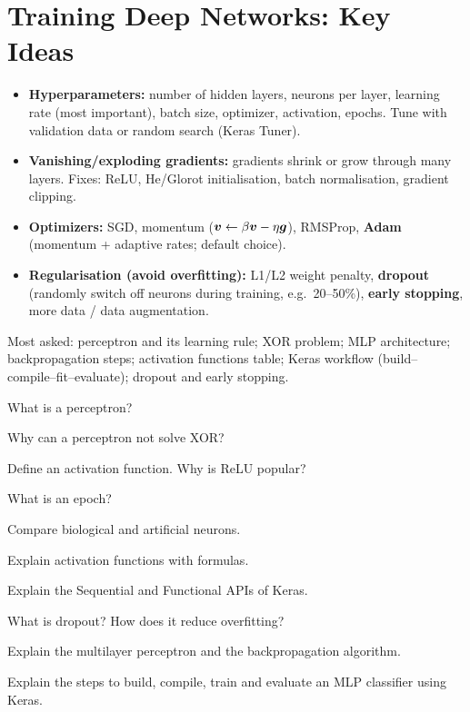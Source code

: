 \section{Training Deep Networks: Key Ideas}
\begin{itemize}
  \item \textbf{Hyperparameters:} number of hidden layers, neurons per layer, learning rate (most important), batch size, optimizer, activation, epochs. Tune with validation data or random search (Keras Tuner).
  \item \textbf{Vanishing/exploding gradients:} gradients shrink or grow through many layers. Fixes: ReLU, He/Glorot initialisation, batch normalisation, gradient clipping.
  \item \textbf{Optimizers:} SGD, momentum ($\boldsymbol{v}\leftarrow\beta\boldsymbol{v}-\eta\boldsymbol{g}$), RMSProp, \textbf{Adam} (momentum + adaptive rates; default choice).
  \item \textbf{Regularisation (avoid overfitting):} L1/L2 weight penalty, \textbf{dropout} (randomly switch off neurons during training, e.g.\ 20--50\%), \textbf{early stopping}, more data / data augmentation.
\end{itemize}

\begin{imp}
Most asked: perceptron and its learning rule; XOR problem; MLP architecture; backpropagation steps; activation functions table; Keras workflow (build--compile--fit--evaluate); dropout and early stopping.
\end{imp}

\begin{iq}
\item \twom What is a perceptron?
\item \twom Why can a perceptron not solve XOR?
\item \twom Define an activation function. Why is ReLU popular?
\item \twom What is an epoch?
\item \fivem Compare biological and artificial neurons.
\item \fivem Explain activation functions with formulas.
\item \fivem Explain the Sequential and Functional APIs of Keras.
\item \fivem What is dropout? How does it reduce overfitting?
\item \tenm Explain the multilayer perceptron and the backpropagation algorithm.
\item \tenm Explain the steps to build, compile, train and evaluate an MLP classifier using Keras.
\end{iq}
